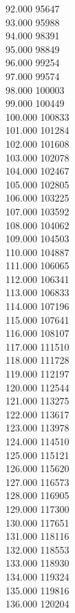 { 92.000	95647 \\
 93.000	95988 \\
 94.000	98391 \\
 95.000	98849 \\
 96.000	99254 \\
 97.000	99574 \\
 98.000	100003 \\
 99.000	100449 \\
 100.000	100833 \\
 101.000	101284 \\
 102.000	101608 \\
 103.000	102078 \\
 104.000	102467 \\
 105.000	102805 \\
 106.000	103225 \\
 107.000	103592 \\
 108.000	104062 \\
 109.000	104503 \\
 110.000	104887 \\
 111.000	106065 \\
 112.000	106341 \\
 113.000	106833 \\
 114.000	107196 \\
 115.000	107641 \\
 116.000	108107 \\
 117.000	111510 \\
 118.000	111728 \\
 119.000	112197 \\
 120.000	112544 \\
 121.000	113275 \\
 122.000	113617 \\
 123.000	113978 \\
 124.000	114510 \\
 125.000	115121 \\
 126.000	115620 \\
 127.000	116573 \\
 128.000	116905 \\
 129.000	117300 \\
 130.000	117651 \\
 131.000	118116 \\
 132.000	118553 \\
 133.000	118930 \\
 134.000	119324 \\
 135.000	119816 \\
 136.000	120204 \\
}
